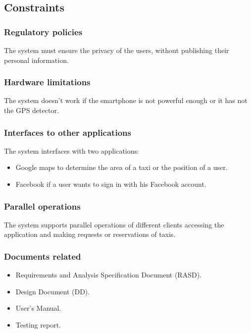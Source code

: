\documentclass[18pt,oneside,a4paper, titlepage]{article}
\begin{document}
	\subsection{Constraints}
		\subsubsection{Regulatory policies}
		The system must ensure the privacy of the users, without publishing their personal information. 
		\subsubsection{Hardware limitations}
		The system doesn't work if the smartphone is not powerful enough or it has not the GPS detector.
		\subsubsection{Interfaces to other applications}
		The system interfaces with two applications:
		\begin{itemize}
			\item Google maps to determine the area of a taxi or the position of a user.
			\item Facebook if a user wants to sign in with his Facebook account.
		\end{itemize}
		\subsubsection{Parallel operations}
			The system supports parallel operations of different clients accessing the application and making requests or reservations of taxis.
		
		\subsubsection{Documents related}
			\begin{itemize}
				\item Requirements and Analysis Specification Document (RASD).
				\item Design Document (DD).
				\item User's Manual.
				\item Testing report.
			\end{itemize}
		
\end{document}

